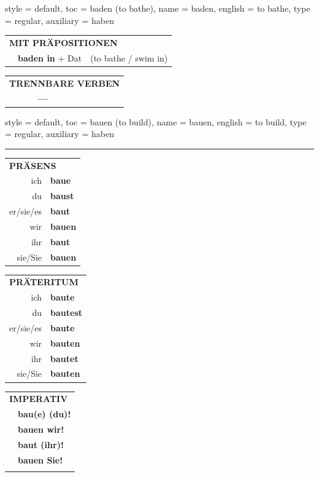 \begin{verbentry}{
  style = {default},
  toc = {baden (to bathe)},
  name = {baden},
  english = {to bathe},
  type = {regular},
  auxiliary = {haben}
}
\vspace{10pt}

\begin{tabular}{lll}
\multicolumn{3}{l}{\textbf{MIT PRÄPOSITIONEN}}\\
& \textbf{baden in} + Dat & (to bathe / swim in)\\
\end{tabular}
\hfill
\begin{tabular}{lll}
\multicolumn{3}{l}{\textbf{TRENNBARE VERBEN}}\\
& \textbf{---} & \\
\end{tabular}
\vspace{-5pt}
\end{verbentry}

\begin{verbentry}{
  style = {default},
  toc = {bauen (to build)},
  name = {bauen},
  english = {to build},
  type = {regular},
  auxiliary = {haben}
}
 
    
     \vspace{5pt}

    \hrule
    
    \vspace{5pt}

  \begin{tabular}{rl}
     \multicolumn{2}{l}{\textbf{PRÄSENS} }\\
    ich & \textbf{baue}\\
    du & \textbf{baust}\\
    er/sie/es & \textbf{baut}\\
    wir & \textbf{bauen}\\
    ihr & \textbf{baut}\\
    sie/Sie & \textbf{bauen}\\
  \end{tabular}
  \hfill
     \begin{tabular}{rl}
    \multicolumn{2}{l}{\textbf{PRÄTERITUM} }\\
    ich & \textbf{baute}\\
    du & \textbf{bautest}\\
    er/sie/es & \textbf{baute}\\
    wir & \textbf{bauten}\\
    ihr & \textbf{bautet}\\
    sie/Sie & \textbf{bauten}\\
  \end{tabular}
  \hfill
  \begin{tabular}{rl}
     \multicolumn{2}{l}{\textbf{IMPERATIV} }\\
   & \textbf{bau(e) (du)!}\\
   & \textbf{bauen wir!}\\
   & \textbf{baut (ihr)!}\\
   & \textbf{bauen Sie!}\\
   & \vspace{10pt}
  \end{tabular}


\end{verbentry}
